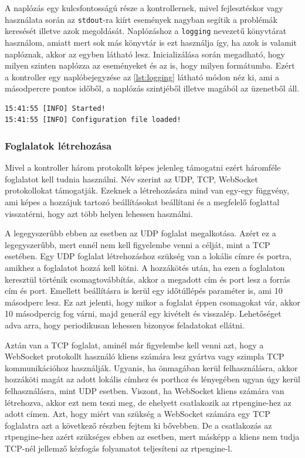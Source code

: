 A naplózás egy kulcsfontosságú része a kontrollernek, mivel fejlesztéskor vagy használata
során az \texttt{stdout}-ra kiírt események nagyban segítik a problémák keresését illetve 
azok megoldását. Naplózáshoz a \texttt{logging} \cite{logging} nevezetű könyvtárat 
használom, amiatt mert sok más könyvtár is ezt használja így, ha azok is valamit 
naplóznak, akkor az egyben látható lesz. Inicializálása során megadható, hogy milyen 
szinten naplózza az eseményeket és az is, hogy milyen formátumba. Ezért a kontroller egy 
naplóbejegyzése az \ref{lst:logging} látható módon néz ki, ami a másodpercre pontos 
időből, a naplózás szintjéből illetve magából az üzenetből áll.

\begin{lstlisting}[caption=Naplózás formátuma, label=lst:logging]
15:41:55 [INFO] Started!
15:41:55 [INFO] Configuration file loaded!
\end{lstlisting}

\subsubsection{Foglalatok létrehozása}

Mivel a kontroller három protokollt képes jelenleg támogatni ezért háromféle foglalatot 
kell tudnia használni. Név szerint az UDP, TCP, WebSocket protokollokat támogatják. 
Ezeknek a létrehozására mind van egy-egy függvény, ami képes a hozzájuk tartozó 
beállításokat beállítani és a megfelelő foglattal visszatérni, hogy azt több helyen 
lehessen használni.

A legegyszerűbb ebben az esetben az UDP foglalat megalkotása. Azért ez a legegyszerűbb,
mert ennél nem kell figyelembe venni a célját, mint a TCP esetében. Egy UDP foglalat 
létrehozáshoz szükség van a lokális címre és portra, amikhez a foglalatot hozzá kell 
kötni. A hozzákötés után, ha ezen a foglalaton keresztül történik csomagtovábbítás, 
akkor a megadott cím és port lesz a forrás cím és port. Emellett beállításra is
kerül egy időtúllépés paraméter is, ami 10 másodperc lesz. Ez azt jelenti, hogy
mikor a foglalat éppen csomagokat vár, akkor 10 másodpercig fog várni, majd generál 
egy kivételt és visszalép. Lehetőséget adva arra, hogy periodikusan lehessen
bizonyos feladatokat ellátni. 

Aztán van a TCP foglalat, aminél már figyelembe kell venni azt, hogy a WebSocket
protokollt használó kliens számára lesz gyártva vagy szimpla TCP kommunikációhoz 
használják. Ugyanis, ha önmagában kerül felhasználásra, akkor hozzáköti magát
az adott lokális címhez és porthoz és lényegében ugyan úgy kerül felhasználásra,
mint UDP esetben. Viszont, ha WebSocket kliens számára van létrehozva, akkor ezt
nem teszi meg, de ehelyett csatlakozik az rtpengine-hez az adott címen. Azt, hogy
miért van szükség a WebSocket számára egy TCP foglalatra azt a következő részben 
fejtem ki bővebben. De a csatlakozás az rtpengine-hez azért szükséges ebben az
esetben, mert másképp a kliens nem tudja TCP-nél jellemző kézfogás folyamatot
teljesíteni az rtpengine-l.

